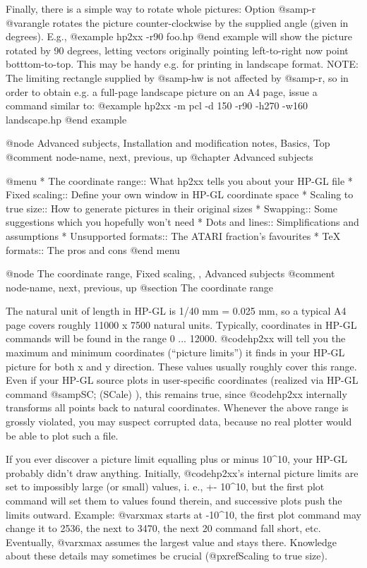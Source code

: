 Finally, there is a simple way to rotate whole pictures:
Option @samp{-r @var{angle}} rotates the picture counter-clockwise by
the supplied angle (given in degrees). E.g.,
@example
hp2xx -r90 foo.hp
@end example
will show the picture rotated by 90 degrees, letting vectors originally
pointing left-to-right now point botttom-to-top. This may be handy e.g. for
printing in landscape format.
NOTE: The limiting rectangle supplied by @samp{-hw} is not affected by
@samp{-r}, so in order to obtain e.g. a full-page landscape picture on an
A4 page, issue a command similar to:
@example
hp2xx -m pcl -d 150 -r90 -h270 -w160 landscape.hp
@end example

@node Advanced subjects, Installation and modification notes, Basics, Top
@comment  node-name,  next,  previous,  up
@chapter Advanced subjects

@menu
* The coordinate range:: What hp2xx tells you about your HP-GL file
* Fixed scaling::        Define your own window in HP-GL coordinate space
* Scaling to true size:: How to generate pictures in their original sizes
* Swapping::             Some suggestions which you hopefully won't need
* Dots and lines::       Simplifications and assumptions
* Unsupported formats::  The ATARI fraction's favourites
* TeX formats::          The pros and cons
@end menu

@node The coordinate range, Fixed scaling, , Advanced subjects
@comment  node-name,  next,  previous,  up
@section The coordinate range

The natural unit of length in HP-GL is 1/40 mm = 0.025 mm, so a typical
A4 page covers roughly 11000 x 7500 natural units. Typically, coordinates in
HP-GL commands will be found in the range 0 ... 12000. @code{hp2xx} will tell
you the maximum and minimum coordinates (``picture limits'')
it finds in your HP-GL picture for both x and y direction.
These values usually roughly cover this range.
Even if your HP-GL source plots in user-specific coordinates (realized
via HP-GL command @samp{SC;} (SCale) ), this remains true, since
@code{hp2xx} internally transforms all points back to natural coordinates.
Whenever the above range is grossly violated, you may suspect corrupted
data, because no real plotter would be able to plot such a file.

If you ever discover a picture limit equalling plus or minus 10^10,
your HP-GL probably didn't draw anything. Initially, @code{hp2xx}'s internal
picture limits are set to impossibly large (or small) values, i. e., +- 10^10,
but the first plot command will set them to values found therein, and successive
plots push the limits outward. Example: @var{xmax} starts at -10^10,
the first plot command may change it to 2536, the next to 3470, the next
20 command fall short, etc. Eventually, @var{xmax} assumes the largest
value and stays there. Knowledge about these details may sometimes
be crucial (@pxref{Scaling to true size}).

